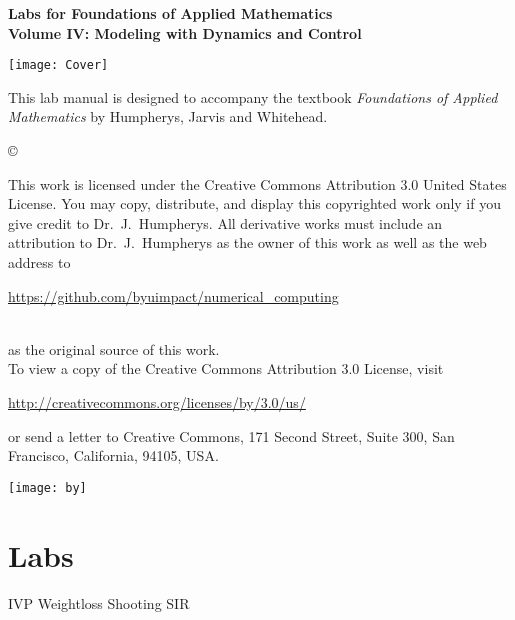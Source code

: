 \documentclass[nociteref]{SIAM-GH-book}
\begin{document}
\thispagestyle{empty}
\begin{center}
{\huge \bf Labs for Foundations of Applied Mathematics} \\
\vspace{5mm}
{\Large \bf Volume IV: Modeling with
Dynamics and Control}
\vspace{20mm}

\texttt{[image: Cover]}
\end{center}
\frontmatter




\begin{thepreface}
This lab manual is designed to accompany the textbook \emph{Foundations of Applied Mathematics} by Humpherys, Jarvis and Whitehead.

\vfill
\copyright{This work is licensed under the Creative Commons Attribution 3.0 United States 
License.  You may copy, distribute, and display this copyrighted work only if you give 
credit to Dr.~J.~Humpherys. All derivative works must include an attribution to Dr.~J.~Humpherys as the owner of this work as well as the web address to 
\\\centerline{\url{https://github.com/byuimpact/numerical_computing}}\\ as the original source of 
this 
work.\\To view a copy of the Creative Commons Attribution 3.0 License, 
visit\\\centerline{\url{http://creativecommons.org/licenses/by/3.0/us/}} or send a letter to 
Creative Commons, 171 Second Street, Suite 300, San Francisco, California, 94105, USA.}

\vfill
\centering\texttt{[image: by]}
\vfill
\end{thepreface}

\setcounter{tocdepth}{1}
\tableofcontents

\mainmatter

\part{Labs}
{IVP}
{Weightloss}
{Shooting}
{SIR}
\end{document}
